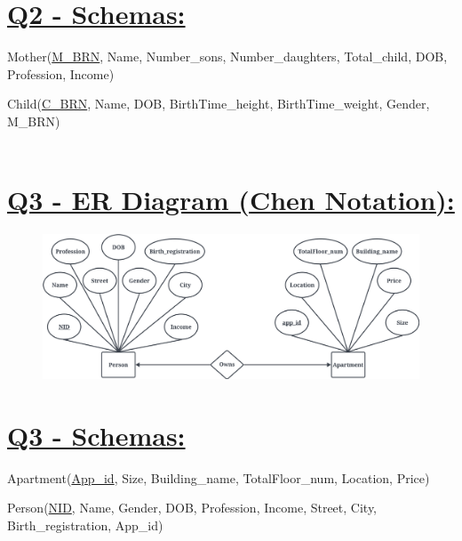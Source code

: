 \documentclass[a4paper, 12pt]{article}
\begin{document}
\section{\textbf{\uline{Q2 - Schemas:}}}
Mother(\uline{M\_BRN}, Name, Number\_sons, Number\_daughters, Total\_child, DOB, Profession, Income)

Child(\uline{C\_BRN}, Name, DOB, BirthTime\_height, BirthTime\_weight, Gender, M\_BRN) 
\\
\\
\section{\textbf{\uline{Q3 - ER Diagram (Chen Notation):}}}
\begin{figure}
    \centering
    \includegraphics[width=1\linewidth]{Q3.jpeg}
\end{figure}

\section{\textbf{\uline{Q3 - Schemas:}}}
Apartment(\uline{App\_id}, Size, Building\_name, TotalFloor\_num, Location, Price)

Person(\uline{NID}, Name, Gender, DOB, Profession, Income, Street, City, Birth\_registration, App\_id)
\end{document}
